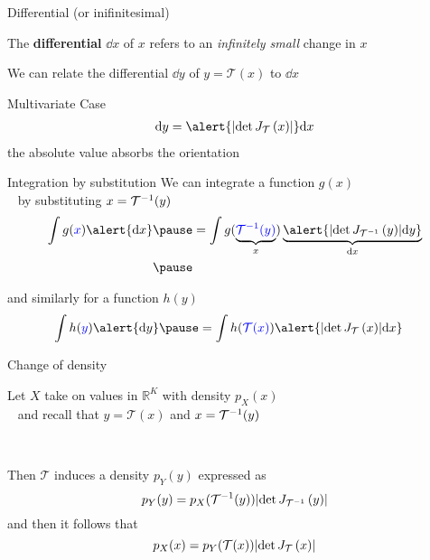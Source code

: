 \documentclass[14pt,dvipsnames, aspectratio=169]{beamer}
\newcommand{\balert}[1]{\textcolor{blue}{#1}}
\begin{document}
\begin{frame}{Differential (or inifinitesimal)}

	The {\bf differential} $\dd x$ of $x$ refers to an \emph{infinitely small} change in $x$\\ \pause
	\vspace{10pt}

	We can relate the differential $\dd y$ of $y = \mathcal T(x)$ to $\dd x$ \pause
	\begin{block}{Multivariate Case}
		\begin{equation*}
        		\begin{aligned}
			     \dd y = \alert{\djac{\mathcal T}{x}} \dd x %
		     \end{aligned}
	     \end{equation*}
		the absolute value absorbs the orientation 
	\end{block}

\end{frame}



\begin{frame}{Integration by substitution}	
	We can integrate a function $g(x)$ \\
	~ by substituting $x = { \mathcal T}^{-1}(y)$
	\begin{equation*}
	\begin{aligned}
		\int g(\balert{x}) \alert{\dd x} \pause &= \int g(\underbrace{\balert{\inv{\mathcal T}(y)}}_{x}) \underbrace{\alert{\djac{\inv{\mathcal T}}{y} \dd y}}_{\dd x} \\ \pause
	\end{aligned}
	\end{equation*}
	
	\vspace{-10pt}
	and similarly for a function $h(y)$
	\begin{equation*}
	\begin{aligned}
		\int h(\balert{y}) \alert{\dd y} \pause &= \int h(\balert{\mathcal T(x)}) \alert{\djac{\mathcal T}{x} \dd x}
	\end{aligned}
	\end{equation*} 

\end{frame}

\begin{frame}{Change of density}

Let $X$ take on values in $\mathbb R^K$ with density $p_X(x)$\\ \pause
~ and recall that $y = \mathcal T(x)$ and $x = {\mathcal T}^{-1}(y)$\\ \pause

~

Then $\mathcal T$ induces a density $p_Y(y)$ expressed as
\begin{equation*}
p_Y(y) = p_X({\mathcal T}^{-1}(y)) \abs{\det J_{{\mathcal T}^{-1}}\left(y\right)}
\end{equation*} \pause
and then it follows that
\begin{equation*}
p_X(x) = p_Y(\mathcal T(x)) \abs{\det J_{\mathcal T}\left(x\right)}
\end{equation*}

	
\end{frame}
\end{document}
